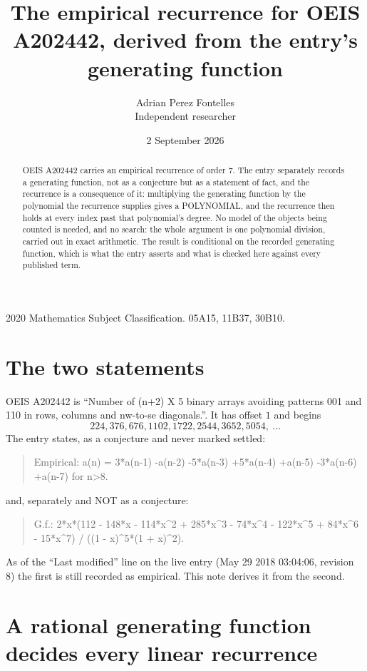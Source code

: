 \documentclass[11pt,a4paper]{article}
\title{The empirical recurrence for OEIS A202442, derived from the entry's generating function}
\author{Adrian Perez Fontelles\\ \small Independent researcher}
\date{2 September 2026}
\theoremstyle{plain}
\theoremstyle{definition}
\begin{document}
\maketitle

\begin{abstract}
OEIS A202442 carries an empirical recurrence of order $7$. The entry separately records a
generating function, not as a conjecture but as a statement of fact, and the recurrence is a
consequence of it: multiplying the generating function by the polynomial the recurrence
supplies gives a POLYNOMIAL, and the recurrence then holds at every index past that
polynomial's degree. No model of the objects being counted is needed, and no search: the
whole argument is one polynomial division, carried out in exact arithmetic. The result is
conditional on the recorded generating function, which is what the entry asserts and what is
checked here against every published term.
\end{abstract}

\noindent\small 2020 Mathematics Subject Classification. 05A15, 11B37, 30B10.\normalsize

\section{The two statements}

OEIS A202442 is ``Number of (n+2) X 5 binary arrays avoiding patterns 001 and 110 in rows, columns and nw-to-se diagonals.''. It has offset $1$ and begins
\[
224, 376, 676, 1102, 1722, 2544, 3652, 5054,\ \dots
\]
The entry states, as a conjecture and never marked settled:
\begin{quote}
Empirical: a(n) = 3*a(n-1) -a(n-2) -5*a(n-3) +5*a(n-4) +a(n-5) -3*a(n-6) +a(n-7) for n>8.
\end{quote}
and, separately and NOT as a conjecture:
\begin{quote}
G.f.: 2*x*(112 - 148*x - 114*x\^{}2 + 285*x\^{}3 - 74*x\^{}4 - 122*x\^{}5 + 84*x\^{}6 - 15*x\^{}7) / ((1 - x)\^{}5*(1 + x)\^{}2).
\end{quote}
As of the ``Last modified'' line on the live entry (May 29 2018 03:04:06, revision 8) the first is still
recorded as empirical. This note derives it from the second.

\section{A rational generating function decides every linear recurrence}
\end{document}
